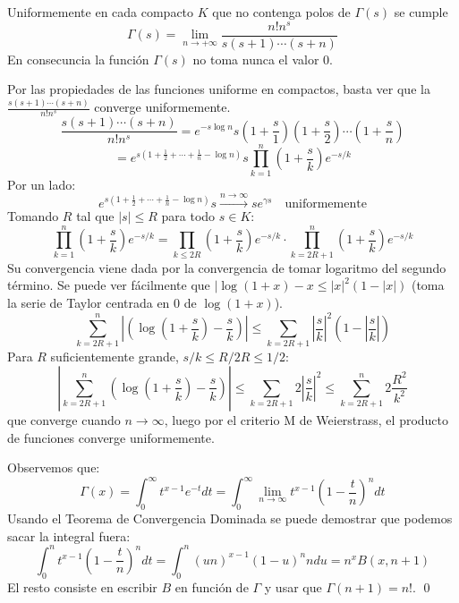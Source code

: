 \documentclass[TAN.tex]{subfiles}
\begin{document}
\begin{prop} Uniformemente en cada compacto $K$ que no contenga polos de $Γ(s)$ se cumple
\[ Γ(s) = \lim_{n\to+∞} \frac{n!n^s}{s(s+1)\cdots(s+n)} \]
En consecuncia la función $Γ(s)$ no toma nunca el valor 0.
\end{prop}
\begin{dem}
Por las propiedades de las funciones uniforme en compactos, basta ver que la $\frac{s(s+1)\cdots(s+n)}{n!n^s}$ converge uniformemente.
\[ \frac{s(s+1)\cdots(s+n)}{n!n^s} = e^{-s \log n} s \left(1 + \frac{s}{1}\right)\left(1 + \frac{s}{2}\right)\cdots \left(1 + \frac{s}{n}\right)\]
\[ = e^{s(1+\frac{1}{2}+\cdots+\frac{1}{n}-\log n)}s\prod_{k=1}^n\left(1+\frac{s}{k}\right)e^{-s/k}\]
Por un lado:
\[ e^{s(1+\frac{1}{2}+\cdots+\frac{1}{n}-\log n)}s \xrightarrow{n\to∞} se^{γs} \quad \text{uniformemente} \]
Tomando $R$ tal que $|s|≤R$ para todo $s \in K$:
\[\prod_{k=1}^n\left(1+\frac{s}{k}\right)e^{-s/k} = \prod_{k≤2R} \left(1+\frac{s}{k}\right)e^{-s/k} \cdot \prod_{k=2R+1}^n \left(1+\frac{s}{k}\right)e^{-s/k} \]
Su convergencia viene dada por la convergencia de tomar logaritmo del segundo término. Se puede ver fácilmente que $|\log(1+x)-x ≤ |x|^2(1-|x|)$ (toma la serie de Taylor centrada en $0$ de $\log(1+x)$).
\[ \sum_{k=2R+1}^n \left|\left(\log(1+\frac{s}{k})-\frac{s}{k}\right)\right| ≤ \sum_{k=2R+1} \left|\frac{s}{k}\right|^2\left(1-\left|\frac{s}{k}\right|\right) \]
Para $R$ suficientemente grande, $s/k ≤ R/2R ≤ 1/2$:
\[ \left|\sum_{k=2R+1}^n \left(\log(1+\frac{s}{k}) - \frac{s}{k}\right)\right| ≤ \sum_{k=2R+1} 2\left|\frac{s}{k}\right|^2 ≤ \sum_{k=2R+1}^n 2 \frac{R^2}{k^2} \]
que converge cuando $n \to ∞$, luego por el criterio M de Weierstrass, el producto de funciones converge uniformemente.

Observemos que:
\[ Γ(x) = \int_0^{∞} t^{x-1} e^{-t} dt =  \int_0^{∞} \lim_{n\to ∞} t^{x-1}\left(1-\frac{t}{n}\right)^n dt \]
Usando el Teorema de Convergencia Dominada se puede demostrar que podemos sacar la integral fuera:
\[ \int_0^n t^{x-1}\left(1-\frac{t}{n}\right)^n dt = \int_0^n (un)^{x-1}(1-u)^n ndu = n^x B(x,n+1) \]
El resto consiste en escribir $B$ en función de $Γ$ y usar que $Γ(n+1)=n!$.
\qed
\end{dem}
\end{document}
